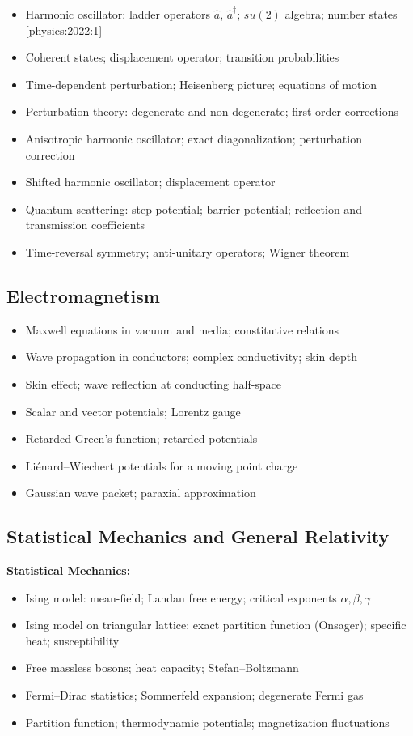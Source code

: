 \begin{itemize}
  \item Harmonic oscillator: ladder operators $\hat a$, $\hat a^\dagger$; $su(2)$ algebra; number states \hfill \cref{physics:2022:1}
  \item Coherent states; displacement operator; transition probabilities
  \item Time-dependent perturbation; Heisenberg picture; equations of motion
  \item Perturbation theory: degenerate and non-degenerate; first-order corrections
  \item Anisotropic harmonic oscillator; exact diagonalization; perturbation correction
  \item Shifted harmonic oscillator; displacement operator
  \item Quantum scattering: step potential; barrier potential; reflection and transmission coefficients
  \item Time-reversal symmetry; anti-unitary operators; Wigner theorem
\end{itemize}

\subsection{Electromagnetism}

\begin{itemize}
  \item Maxwell equations in vacuum and media; constitutive relations
  \item Wave propagation in conductors; complex conductivity; skin depth
  \item Skin effect; wave reflection at conducting half-space
  \item Scalar and vector potentials; Lorentz gauge
  \item Retarded Green's function; retarded potentials
  \item Li\'enard--Wiechert potentials for a moving point charge
  \item Gaussian wave packet; paraxial approximation
\end{itemize}

\subsection{Statistical Mechanics and General Relativity}

\textbf{Statistical Mechanics:}
\begin{itemize}
  \item Ising model: mean-field; Landau free energy; critical exponents $\alpha,\beta,\gamma$
  \item Ising model on triangular lattice: exact partition function (Onsager); specific heat; susceptibility
  \item Free massless bosons; heat capacity; Stefan--Boltzmann
  \item Fermi--Dirac statistics; Sommerfeld expansion; degenerate Fermi gas
  \item Partition function; thermodynamic potentials; magnetization fluctuations
\end{itemize}

